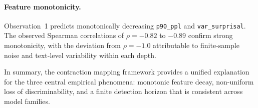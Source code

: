\paragraph{Feature monotonicity.}
Observation~1 predicts monotonically decreasing \texttt{p90\_ppl} and \texttt{var\_surprisal}. The observed Spearman correlations of $\rho = -0.82$ to $-0.89$ confirm strong monotonicity, with the deviation from $\rho = -1.0$ attributable to finite-sample noise and text-level variability within each depth.

In summary, the contraction mapping framework provides a unified explanation for the three central empirical phenomena: monotonic feature decay, non-uniform loss of discriminability, and a finite detection horizon that is consistent across model families.

